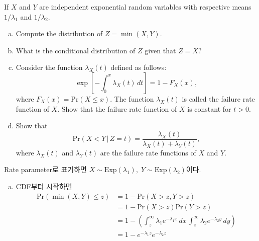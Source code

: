 \documentclass[answers]{exam}
\begin{document}
\newpage
{}
\begin{questions}
   \question
   If $X$ and $Y$ are independent exponential random variables with respective means $1/\lambda_{1}$ and $1/\lambda_{2}$.
   \begin{enumerate}[(a)]
    \item Compute the distribution of $Z=\min\left(X,Y\right)$.
    \item What is the conditional distribution of $Z$ given that $Z=X$?
    \item Consider the function $\lambda_{X}\left(t\right)$ defined as follows:
    \begin{equation}
        \exp\left[-\int_{0}^{x}\lambda_{X}\left(t\right)\,dt \right]=1-F_{X}\left(x\right),
    \end{equation}
    where $F_{X}\left(x\right)=\mathrm{Pr}\left(X\leq x\right)$. The function $\lambda_{X}\left(t\right)$ is called the failure rate function of $X$. Show that the failure rate function of $X$ is constant for $t>0$.
    \item Show that
    \begin{equation}
        \mathrm{Pr}\left(X<Y\,|\,Z=t\right)=\dfrac{\lambda_{X}\left(t\right)}{\lambda_{X}\left(t\right)+\lambda_{Y}\left(t\right)},
    \end{equation}
    where $\lambda_{X}\left(t\right)$ and $\lambda_{Y}\left(t\right)$ are the failure rate functions of $X$ and $Y$.
   \end{enumerate}
   \begin{solution}
    Rate parameter로 표기하면 $X\sim \mathrm{Exp}\left(\lambda_{1}\right),\; Y\sim\mathrm{Exp}\left(\lambda_{2}\right)$이다.
    \begin{enumerate}[(a)]
      \item CDF부터 시작하면
      \begin{align}
        \mathrm{Pr}\left(\min\left(X,Y\right)\leq z\right) &= 1-\mathrm{Pr}\left(X>z,Y>z\right)\\
        &=1-\mathrm{Pr}\left(X>z\right)\mathrm{Pr}\left(Y>z\right)\\
        &=1-\left(\int_{z}^{\infty}\lambda_{1}e^{-\lambda_{1}x}\,dx\,\int_{z}^{\infty}\lambda_{2}e^{-\lambda_{2}y}\,dy\right)\\
        &=1-e^{-\lambda_{1}z}e^{-\lambda_{2}z} \\

\end{align}
\end{enumerate}
\end{solution}
\end{questions}
\end{document}
